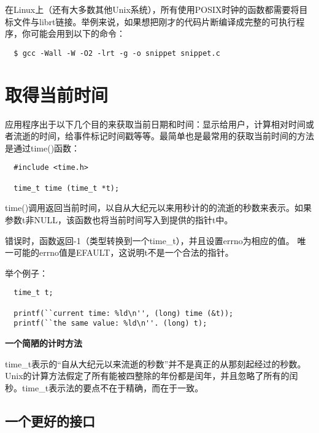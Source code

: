 在Linux上（还有大多数其他Unix系统），所有使用POSIX时钟的函数都需要将目标文件与librt链接。举例来说，如果想把刚才的代码片断编译成完整的可执行程序，你可能会用到以下的命令：

\begin{verbatim}
  $ gcc -Wall -W -O2 -lrt -g -o snippet snippet.c
\end{verbatim}

\section{取得当前时间}

应用程序出于以下几个目的来获取当前日期和时间：显示给用户，计算相对时间或者流逝的时间，给事件标记时间戳等等。最简单也是最常用的获取当前时间的方法是通过time()函数：

\begin{lstlisting}
  #include <time.h>

  time_t time (time_t *t);
\end{lstlisting}

time()调用返回当前时间，以自从大纪元以来用秒计的的流逝的秒数来表示。如果参数t非NULL，该函数也将当前时间写入到提供的指针t中。

错误时，函数返回-1（类型转换到一个time\_t），并且设置errno为相应的值。 唯一可能的errno值是EFAULT，这说明t不是一个合法的指针。

举个例子： 

\begin{lstlisting}
  time_t t;

  printf(``current time: %ld\n'', (long) time (&t));
  printf(``the same value: %ld\n''. (long) t);
\end{lstlisting}

\begin{center}
\begin{boxedminipage}{\textwidth}
\begin{center}\textbf{ 一个简陋的计时方法}\end{center}
time\_t表示的“自从大纪元以来流逝的秒数”并不是真正的从那刻起经过的秒数。Unix的计算方法假定了所有能被四整除的年份都是闰年，并且忽略了所有的闰秒。time\_t表示法的要点不在于精确，而在于一致。
\end{boxedminipage}
\end{center}


\subsection{一个更好的接口}

